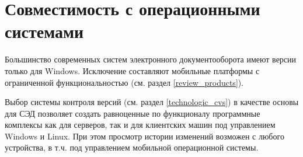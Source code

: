 \section{Совместимость с операционными системами} \label{technologic_os}

Большинство современных систем электронного документооборота имеют версии только для Windows. Исключение составляют мобильные платформы с ограниченной функциональностью (см. раздел \ref{review_products}).

\vspace{\baselineskip}
Выбор системы контроля версий (см. раздел \ref{technologic_cvs}) в качестве основы для СЭД позволяет создать равноценные по функционалу программные комплексы как для серверов, так и для клиентских машин под управлением Windows и Linux. При этом просмотр истории изменений возможен с любого устройства, в т.ч. под управлением мобильной операционной системы.